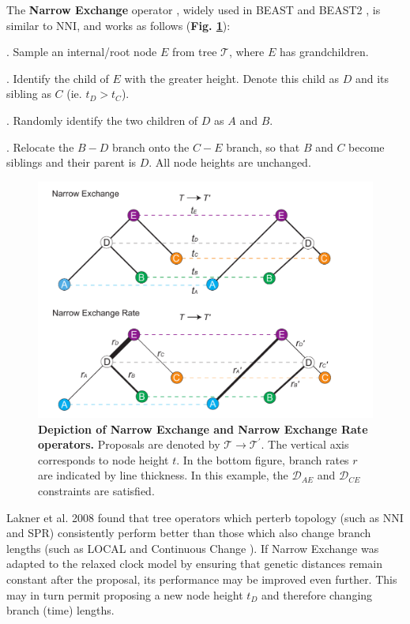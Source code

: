 \documentclass[10pt,letterpaper]{article}
\begin{document}
The \textbf{Narrow Exchange} operator \cite{drummond2002estimating}, widely used in BEAST \cite{drummond2012bayesian} and BEAST2 \cite{bouckaert2019beast}, is similar to NNI, and works as follows (\textbf{Fig. \ref{fig:narrowexchange}}):

. Sample an internal/root node $E$ from tree $\mathcal{T}$, where $E$ has grandchildren.

. Identify the child of $E$ with the greater height. Denote this child as $D$ and its sibling as $C$ (ie. $t_D > t_C$).

. Randomly identify the two children of $D$ as $A$ and $B$.

. Relocate the $B-D$ branch onto the $C-E$ branch, so that $B$ and $C$ become siblings and their parent is $D$. All node heights are unchanged.


\begin{figure}[!h]
\includegraphics[width=\textwidth]{Figures/NarrowExchange.pdf}
\caption{\textbf{Depiction of Narrow Exchange and Narrow Exchange Rate operators.} Proposals are denoted by $\mathcal{T} \rightarrow \mathcal{T}^\prime$. The vertical axis corresponds to node height $t$. In the bottom figure, branch rates $r$ are indicated by line thickness. In this example, the $\mathcal{D}_{AE}$ and $\mathcal{D}_{CE}$ constraints are satisfied.}
\label{fig:narrowexchange}
\end{figure}


Lakner et al. 2008 \cite{lakner2008efficiency} found that tree operators which perterb topology (such as NNI and SPR) consistently perform better than those which also change branch lengths (such as LOCAL \cite{simon1998local} and Continuous Change \cite{jow2002bayesian}). If Narrow Exchange was adapted to the relaxed clock model by ensuring that genetic distances remain constant after the proposal, its performance may be improved even further. This may in turn permit proposing a new node height $t_D$ and therefore changing branch (time) lengths.
\end{document}

